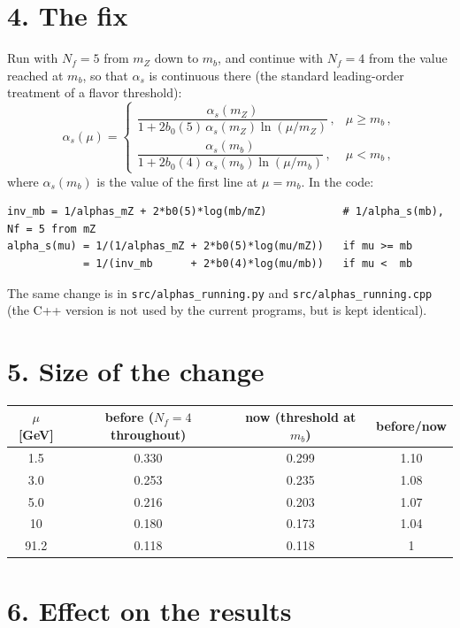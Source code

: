 \documentclass[12pt]{article}
\begin{document}
\section*{4. The fix}

Run with $N_f=5$ from $m_Z$ down to $m_b$, and continue with $N_f=4$ from the value reached at
$m_b$, so that $\alpha_s$ is continuous there (the standard leading-order treatment of a flavor
threshold):
\[
  \alpha_s(\mu)=
  \begin{cases}
    \dfrac{\alpha_s(m_Z)}{1+2b_0(5)\,\alpha_s(m_Z)\ln(\mu/m_Z)}\,, & \mu\geq m_b\,,\\[12pt]
    \dfrac{\alpha_s(m_b)}{1+2b_0(4)\,\alpha_s(m_b)\ln(\mu/m_b)}\,, & \mu<m_b\,,
  \end{cases}
\]
where $\alpha_s(m_b)$ is the value of the first line at $\mu=m_b$. In the code:
\begin{lstlisting}
inv_mb = 1/alphas_mZ + 2*b0(5)*log(mb/mZ)            # 1/alpha_s(mb), Nf = 5 from mZ
alpha_s(mu) = 1/(1/alphas_mZ + 2*b0(5)*log(mu/mZ))   if mu >= mb
            = 1/(inv_mb      + 2*b0(4)*log(mu/mb))   if mu <  mb
\end{lstlisting}
The same change is in \texttt{src/alphas\_running.py} and \texttt{src/alphas\_running.cpp} (the
C++ version is not used by the current programs, but is kept identical).

\section*{5. Size of the change}

\begin{center}
\begin{tabular}{cccc}
\toprule
$\mu$ [GeV] & before ($N_f=4$ throughout) & now (threshold at $m_b$) & before/now \\
\midrule
1.5  & 0.330 & 0.299 & 1.10 \\
3.0  & 0.253 & 0.235 & 1.08 \\
5.0  & 0.216 & 0.203 & 1.07 \\
10   & 0.180 & 0.173 & 1.04 \\
91.2 & 0.118 & 0.118 & 1    \\
\bottomrule
\end{tabular}
\end{center}

\section*{6. Effect on the results}
\end{document}
